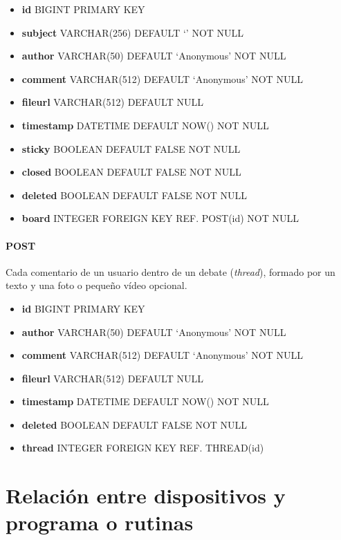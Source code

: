\documentclass[12pt,a4paper,titlepage]{article}
\begin{document}
    \begin{itemize}
        \item \textbf{id} BIGINT PRIMARY KEY
        \item \textbf{subject} VARCHAR(256) DEFAULT `' NOT NULL
        \item \textbf{author} VARCHAR(50) DEFAULT `Anonymous' NOT NULL
        \item \textbf{comment} VARCHAR(512) DEFAULT `Anonymous' NOT NULL
        \item \textbf{fileurl} VARCHAR(512) DEFAULT NULL
        \item \textbf{timestamp} DATETIME DEFAULT NOW() NOT NULL
        \item \textbf{sticky} BOOLEAN DEFAULT FALSE NOT NULL
        \item \textbf{closed} BOOLEAN DEFAULT FALSE NOT NULL
        \item \textbf{deleted} BOOLEAN DEFAULT FALSE NOT NULL
        \item \textbf{board} INTEGER FOREIGN KEY REF. POST(id) NOT NULL
    \end{itemize}

    \paragraph{POST} Cada comentario de un usuario dentro de un debate (\textit{thread}), formado por un texto y una foto o pequeño vídeo opcional.

    \begin{itemize}
        \item \textbf{id} BIGINT PRIMARY KEY
        \item \textbf{author} VARCHAR(50) DEFAULT `Anonymous' NOT NULL
        \item \textbf{comment} VARCHAR(512) DEFAULT `Anonymous' NOT NULL
        \item \textbf{fileurl} VARCHAR(512) DEFAULT NULL
        \item \textbf{timestamp} DATETIME DEFAULT NOW() NOT NULL
        \item \textbf{deleted} BOOLEAN DEFAULT FALSE NOT NULL
        \item \textbf{thread} INTEGER FOREIGN KEY REF. THREAD(id)
    \end{itemize}

    \section{Relación entre dispositivos y programa o rutinas}
\end{document}
